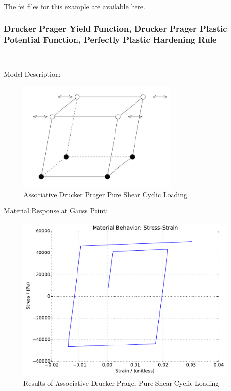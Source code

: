 \documentclass[fleqn,11pt]{article}
\begin{document}
The fei files for this example are available \href{https://github.com/yuan-energy/education_examples/tree/master/fei_examples/Drucker_Prager_Non_associate_Flow_Solid/2pure_shear_cyclic_loading}{here}.


\newpage
\subsubsection{Drucker Prager Yield Function, Drucker Prager Plastic Potential Function, Perfectly Plastic Hardening Rule} ~ 

Model Description:

\begin{figure}[H]
\begin{center}
\includegraphics[width=8cm]{../Figure-files/shear_cyclic_brick.JPG}
\caption{
\label{Associative Drucker Prager Pure Shear Cyclic Loadin}
Associative Drucker Prager Pure Shear Cyclic Loading}
\end{center}
\end{figure}

Material Response at Gauss Point:

\begin{figure}[H]
\begin{center}
\includegraphics[width=11cm]{../fei_examples/Drucker_Prager_Associate_Flow_Solid/2pure_shear_cyclic_loading/result.pdf}
\caption{
\label{Results of Associative Drucker Prager Pure Shear Cyclic Loadin}
Results of Associative Drucker Prager Pure Shear Cyclic Loading}
\end{center}
\end{figure}
\end{document}

